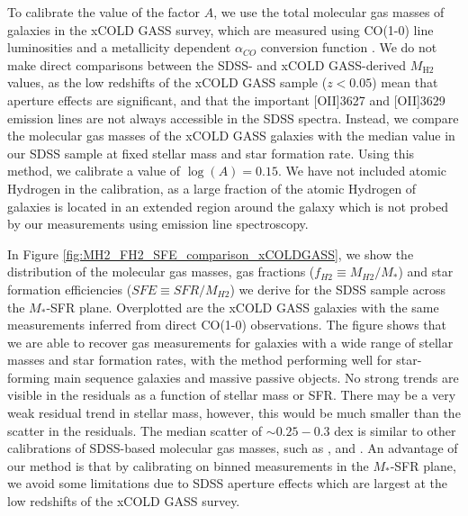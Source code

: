 \documentclass[fleqn,usenatbib]{mnras}
\begin{document}
To calibrate the value of the factor $A$, we use the total molecular gas masses of galaxies in the xCOLD GASS survey, which are measured using CO(1-0) line luminosities and a metallicity dependent $\alpha_{CO}$ conversion function \citep{saintonge2017}. We do not make direct comparisons between the SDSS- and xCOLD GASS-derived $M_{\textrm{H2}}$ values, as the low redshifts of the xCOLD GASS sample ($z<0.05$) mean that aperture effects are significant, and that the important [OII]3627 and [OII]3629 emission lines are not always accessible in the SDSS spectra. Instead, we compare the molecular gas masses of the xCOLD GASS galaxies with the median value in our SDSS sample at fixed stellar mass and star formation rate. Using this method, we calibrate a value of $\log(A) = 0.15$. We have not included atomic Hydrogen in the calibration, as a large fraction of the atomic Hydrogen of galaxies is located in an extended region around the galaxy which is not probed by our measurements using emission line spectroscopy.

In Figure \ref{fig:MH2_FH2_SFE_comparison_xCOLDGASS}, we show the distribution of the molecular gas masses, gas fractions ($f_{H2} \equiv M_{H2}/M_{\ast}$) and star formation efficiencies ($SFE \equiv SFR / M_{H2}$) we derive for the SDSS sample across the $M_{*}$-SFR plane. Overplotted are the xCOLD GASS galaxies with the same measurements inferred from direct CO(1-0) observations.  The figure shows that we are able to recover gas measurements for galaxies with a wide range of stellar masses and star formation rates, with the method performing well for star-forming main sequence galaxies and massive passive objects. No strong trends are visible in the residuals as a function of stellar mass or SFR. There may be a very weak residual trend in stellar mass, however, this would be much smaller than the scatter in the residuals. The median scatter of $\sim0.25-0.3$ dex is similar to other calibrations of SDSS-based molecular gas masses, such as \cite{concas2019}, \cite{yesuf2019} and \cite{piotrowska2020}. An advantage of our method is that by calibrating on binned measurements in the $M_{*}$-SFR plane, we avoid some limitations due to SDSS aperture effects which are largest at the low redshifts of the xCOLD GASS survey. 
\end{document}
